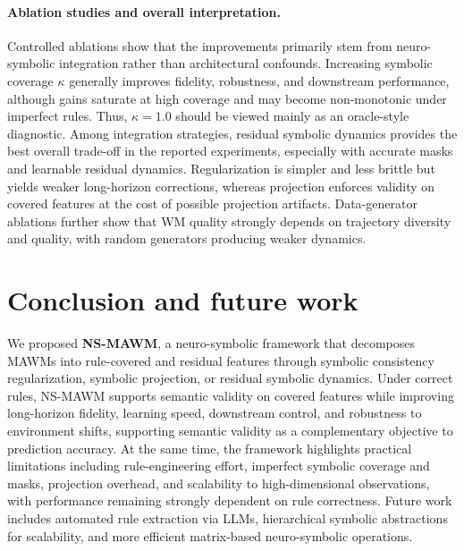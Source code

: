 \documentclass{article}
\theoremstyle{plain}
\theoremstyle{definition}
\theoremstyle{remark}
\begin{document}
\paragraph{Ablation studies and overall interpretation.}

Controlled ablations show that the improvements primarily stem from neuro-symbolic integration rather than architectural confounds. Increasing symbolic coverage $\kappa$ generally improves fidelity, robustness, and downstream performance, although gains saturate at high coverage and may become non-monotonic under imperfect rules. Thus, $\kappa=1.0$ should be viewed mainly as an oracle-style diagnostic.
Among integration strategies, residual symbolic dynamics provides the best overall trade-off in the reported experiments, especially with accurate masks and learnable residual dynamics. Regularization is simpler and less brittle but yields weaker long-horizon corrections, whereas projection enforces validity on covered features at the cost of possible projection artifacts. Data-generator ablations further show that WM quality strongly depends on trajectory diversity and quality, with random generators producing weaker dynamics.


\section{Conclusion and future work}
\label{sec:conclusion}

We proposed \textbf{NS-MAWM}, a neuro-symbolic framework that decomposes MAWMs into rule-covered and residual features through symbolic consistency regularization, symbolic projection, or residual symbolic dynamics. Under correct rules, NS-MAWM supports semantic validity on covered features while improving long-horizon fidelity, learning speed, downstream control, and robustness to environment shifts, supporting semantic validity as a complementary objective to prediction accuracy. At the same time, the framework highlights practical limitations including rule-engineering effort, imperfect symbolic coverage and masks, projection overhead, and scalability to high-dimensional observations, with performance remaining strongly dependent on rule correctness. Future work includes automated rule extraction via LLMs, hierarchical symbolic abstractions for scalability, and more efficient matrix-based neuro-symbolic operations.





\appendix
\end{document}
